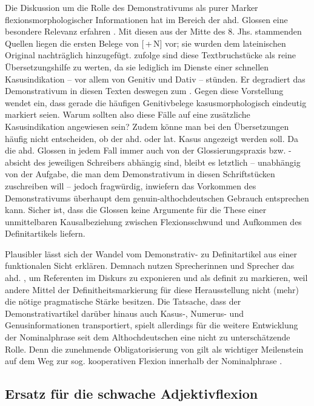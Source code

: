 Die Diskussion um die Rolle des Demonstrativums als purer Marker flexionsmorphologischer Informationen hat im Bereich der ahd. Glossen eine besondere Relevanz erfahren \parencite{Glaser2000}. Mit diesen aus der Mitte des 8. Jhs. stammenden Quellen liegen die ersten Belege von [\,+\,N] vor; sie wurden dem lateinischen Original nachträglich  hinzugefügt. \textcite[12]{Hodler1954} zufolge sind diese Textbruchstücke als reine Übersetzungshilfe zu werten, da sie lediglich im Dienste einer schnellen Kasusindikation -- vor allem von Genitiv und Dativ -- stünden. Er degradiert das Demonstrativum in diesen Texten deswegen zum  \parencite[12]{Hodler1954}. Gegen diese Vorstellung wendet \textcite[209f.]{Glaser2000} ein, dass  gerade die häufigen Genitivbelege kasusmorphologisch eindeutig markiert seien. Warum sollten also diese Fälle auf eine zusätzliche Kasusindikation angewiesen sein? Zudem könne man bei den Übersetzungen häufig nicht entscheiden, ob der ahd. oder lat. Kasus angezeigt werden soll. Da die ahd. Glossen in jedem Fall immer auch von der Glossierungspraxis bzw. -absicht des jeweiligen Schreibers abhängig sind, bleibt es letztlich  -- unabhängig von der Aufgabe, die man dem Demonstrativum in diesen Schriftstücken zuschreiben will -- jedoch fragwürdig, inwiefern das Vorkommen des Demonstrativums überhaupt dem genuin-althochdeutschen Gebrauch entsprechen kann. Sicher ist, dass die Glossen keine Argumente für die These einer unmittelbaren Kausalbeziehung zwischen Flexionsschwund und Aufkommen des Definitartikels liefern.

Plausibler lässt sich der Wandel vom Demonstrativ- zu Definitartikel aus einer funktionalen Sicht erklären. Demnach nutzen Sprecherinnen und Sprecher das ahd. , um Referenten im Diskurs zu exponieren und als definit zu markieren, weil andere Mittel der Definitheitsmarkierung für diese Herausstellung nicht (mehr) die nötige pragmatische Stärke besitzen. Die Tatsache, dass der Demonstrativartikel darüber hinaus auch Kasus-, Numerus- und Genusinformationen transportiert, spielt allerdings für die weitere Entwicklung  der Nominalphrase seit dem Althochdeutschen eine nicht zu unterschätzende Rolle. Denn die zunehmende Obligatorisierung von  gilt als wichtiger Meilenstein auf dem Weg zur sog. kooperativen Flexion innerhalb der Nominalphrase \parencite[s. u.a.][]{Ronneberger-Sibold2010a,Szczepaniak2010}.
 
\subsection{Ersatz für die schwache Adjektivflexion} \label{ersatz-schwach}

